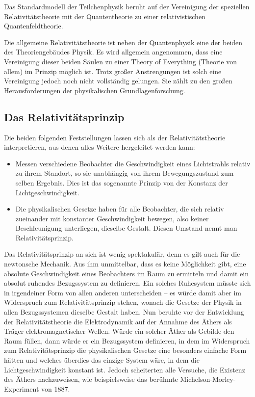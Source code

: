 \begin{nohyphens}
Das Standardmodell der Teilchenphysik beruht auf der Vereinigung der speziellen Relativitätstheorie mit der Quantentheorie zu einer relativistischen Quantenfeldtheorie.

Die allgemeine Relativitätstheorie ist neben der Quantenphysik eine der beiden  des Theoriengebäudes Physik. Es wird allgemein angenommen, dass eine Vereinigung dieser beiden Säulen zu einer Theory of Everything (Theorie von allem) im Prinzip möglich ist. Trotz großer Anstrengungen ist solch eine Vereinigung jedoch noch nicht vollständig gelungen. Sie zählt zu den großen Herausforderungen der physikalischen Grundlagenforschung.

\subsection{Das Relativitätsprinzip}

Die beiden folgenden Feststellungen lassen sich als  der Relativitätstheorie interpretieren, aus denen alles Weitere hergeleitet werden kann:

\begin{itemize}\Lf
  \item Messen verschiedene Beobachter die Geschwindigkeit eines Lichtstrahls relativ zu ihrem Standort, so  sie unabhängig von ihrem  Bewegungszustand zum selben Ergebnis. Dies ist das sogenannte Prinzip von der Konstanz der Lichtgeschwindigkeit.
  \item Die physikalischen Gesetze haben für alle Beobachter, die sich relativ zueinander mit konstanter Geschwindigkeit bewegen, also keiner Beschleunigung unterliegen, dieselbe Gestalt. Diesen Umstand nennt man Relativitätsprinzip.
\end{itemize}

Das Relativitätsprinzip an sich ist wenig spektakulär, denn es gilt auch für die newtonsche Mechanik. Aus ihm  unmittelbar, dass es keine Möglichkeit gibt, eine absolute Geschwindigkeit eines Beobachters im Raum zu ermitteln und damit ein absolut ruhendes Bezugssystem zu definieren. Ein solches Ruhesystem müsste sich in irgendeiner Form von allen anderen unterscheiden – es würde damit aber im Widerspruch zum Relativitätsprinzip stehen, wonach die Gesetze der Physik in allen Bezugssystemen dieselbe Gestalt haben. Nun beruhte vor der Entwicklung der Relativitätstheorie die Elektrodynamik auf der Annahme des Äthers als Träger elektromagnetischer Wellen. Würde ein solcher Äther als  Gebilde den Raum füllen, dann würde er ein Bezugssystem definieren, in dem im Widerspruch zum Relativitätsprinzip die physikalischen Gesetze eine besonders einfache Form hätten und welches überdies das einzige System wäre, in dem die Lichtgeschwindigkeit konstant ist. Jedoch scheiterten alle Versuche, die Existenz des Äthers nachzuweisen, wie beispielsweise das berühmte Michelson-Morley-Experiment von 1887.


\end{nohyphens}
